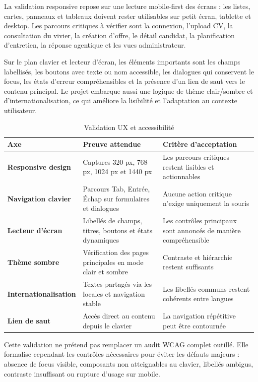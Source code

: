 La validation responsive repose sur une lecture mobile-first des écrans : les listes, cartes, panneaux et tableaux doivent rester utilisables sur petit écran, tablette et desktop. Les parcours critiques à vérifier sont la connexion, l'upload CV, la consultation du vivier, la création d'offre, le détail candidat, la planification d'entretien, la réponse agentique et les vues administrateur.

Sur le plan clavier et lecteur d'écran, les éléments importants sont les champs labellisés, les boutons avec texte ou nom accessible, les dialogues qui conservent le focus, les états d'erreur compréhensibles et la présence d'un lien de saut vers le contenu principal. Le projet embarque aussi une logique de thème clair/sombre et d'internationalisation, ce qui améliore la lisibilité et l'adaptation au contexte utilisateur.

\begin{table}[H]
  \centering
  \caption{Validation UX et accessibilité}
  \begin{tabularx}{\textwidth}{>{\bfseries}p{3.2cm}X X}
    \toprule
    Axe & Preuve attendue & Critère d'acceptation \\
    \midrule
    Responsive design & Captures 320 px, 768 px, 1024 px et 1440 px & Les parcours critiques restent lisibles et actionnables \\
    Navigation clavier & Parcours Tab, Entrée, Échap sur formulaires et dialogues & Aucune action critique n'exige uniquement la souris \\
    Lecteur d'écran & Libellés de champs, titres, boutons et états dynamiques & Les contrôles principaux sont annoncés de manière compréhensible \\
    Thème sombre & Vérification des pages principales en mode clair et sombre & Contraste et hiérarchie restent suffisants \\
    Internationalisation & Textes partagés via les locales et navigation stable & Les libellés communs restent cohérents entre langues \\
    Lien de saut & Accès direct au contenu depuis le clavier & La navigation répétitive peut être contournée \\
    \bottomrule
  \end{tabularx}
\end{table}

Cette validation ne prétend pas remplacer un audit WCAG complet outillé. Elle formalise cependant les contrôles nécessaires pour éviter les défauts majeurs : absence de focus visible, composants non atteignables au clavier, libellés ambigus, contraste insuffisant ou rupture d'usage sur mobile.


